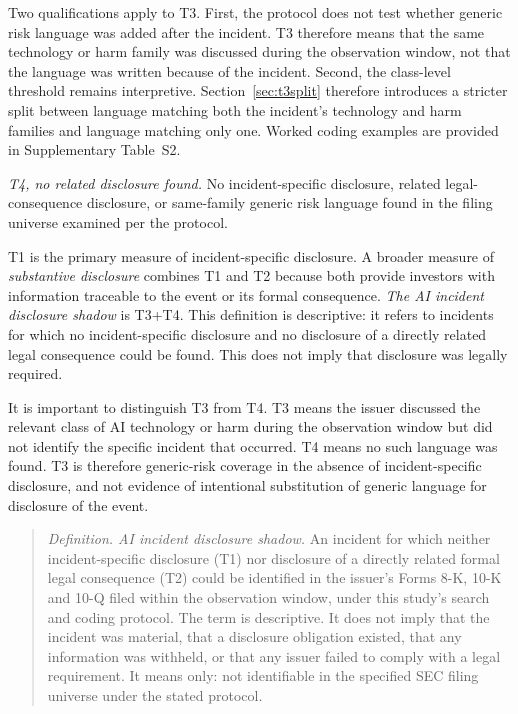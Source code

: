 \documentclass[utf8]{FrontiersinHarvard}
\begin{document}
Two qualifications apply to T3. First, the protocol does not test whether generic risk language was added after the incident. T3 therefore means that the same technology or harm family was discussed during the observation window, not that the language was written because of the incident. Second, the class-level threshold remains interpretive. Section~\ref{sec:t3split} therefore introduces a stricter split between language matching both the incident's technology and harm families and language matching only one. Worked coding examples are provided in Supplementary Table~S2.

\textit{T4, no related disclosure found.} No incident-specific disclosure, related legal-consequence disclosure, or same-family generic risk language found in the filing universe examined per the protocol.

T1 is the primary measure of incident-specific disclosure. A broader measure of \textit{substantive disclosure} combines T1 and T2 because both provide investors with information traceable to the event or its formal consequence. \textit{The AI incident disclosure shadow}\label{sec:shadowdef} is T3+T4. This definition is descriptive: it refers to incidents for which no incident-specific disclosure and no disclosure of a directly related legal consequence could be found. This does not imply that disclosure was legally required.

It is important to distinguish T3 from T4. T3 means the issuer discussed the relevant class of AI technology or harm during the observation window but did not identify the specific incident that occurred. T4 means no such language was found. T3 is therefore generic-risk coverage in the absence of incident-specific disclosure, and not evidence of intentional substitution of generic language for disclosure of the event.

\begin{quote}
\textit{Definition. AI incident disclosure shadow.} An incident for which neither incident-specific disclosure (T1) nor disclosure of a directly related formal legal consequence (T2) could be identified in the issuer's Forms 8-K, 10-K and 10-Q filed within the observation window, under this study's search and coding protocol. The term is descriptive. It does not imply that the incident was material, that a disclosure obligation existed, that any information was withheld, or that any issuer failed to comply with a legal requirement. It means only: not identifiable in the specified SEC filing universe under the stated protocol.
\end{quote}
\end{document}
